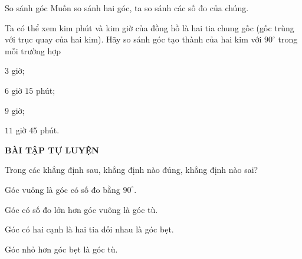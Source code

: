 \begin{dang}{So sánh góc}
Muốn so sánh hai góc, ta so sánh các số đo của chúng.
\end{dang}
\begin{vd}%
	Ta có thể xem kim phút và kim giờ của đồng hồ là hai tia chung gốc (gốc trùng với trục quay của hai kim). Hãy so sánh góc tạo thành của hai kim với $90^\circ$ trong mỗi trường hợp
	\begin{listEX}[4]
		\item $3$ giờ;
		\item $6$ giờ $15$ phút;
		\item $9$ giờ;
		\item $11$ giờ $45$ phút.
	\end{listEX}
\end{vd}
\begin{center}
\textbf{BÀI TẬP TỰ LUYỆN}
\end{center}
\begin{bt}%
Trong các khẳng định sau, khẳng định nào đúng, khẳng định nào sai?
\begin{listEX}
	\item Góc vuông là góc có số đo bằng $90^\circ$.
	\item Góc có số đo lớn hơn góc vuông là góc tù.
	\item Góc có hai cạnh là hai tia đối nhau là góc bẹt.
	\item Góc nhỏ hơn góc bẹt là góc tù.
\end{listEX}
\end{bt}
